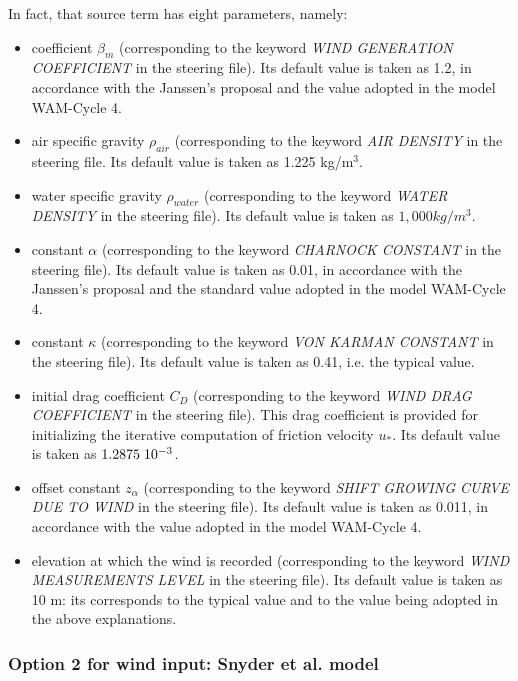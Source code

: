 In fact, that source term has eight parameters, namely:

\begin{itemize}
\item  coefficient $\beta_m$ (corresponding to the keyword \textit{WIND
  GENERATION COEFFICIENT }in the steering file). Its default value is taken
  as 1.2, in accordance with the Janssen's proposal \cite{Janssen1991} and
  the value adopted in the model WAM-Cycle 4.
\item  air specific gravity $\rho_{air}$ (corresponding to the keyword
  \textit{AIR DENSITY} in the steering file. Its default value is taken as
  1.225 kg/m${}^{3}$.
\item  water specific gravity ${\rho}_{water}$ (corresponding to the keyword
  \textit{WATER DENSITY} in the steering file). Its default value is taken as
  $1,000 kg/m^{3}$.
\item  constant $\alpha$ (corresponding to the keyword \textit{CHARNOCK
  CONSTANT} in the steering file). Its default value is taken as 0.01, in
  accordance with the Janssen's proposal and the standard value adopted in the
  model WAM-Cycle 4.
\item  constant $\kappa$ (corresponding to the keyword \textit{VON KARMAN
  CONSTANT} in the steering file). Its default value is taken as 0.41, i.e.
  the typical value.
\item  initial drag coefficient $C_D$ (corresponding to the keyword
  \textit{WIND DRAG COEFFICIENT} in the steering file). This drag coefficient
  is provided for initializing the iterative computation of friction velocity
  $u_*$. Its default value is taken as $1.2875\hspace{.1cm} 10^{-3}$.
\item  offset constant $z_\alpha$ (corresponding to the keyword \textit{SHIFT
  GROWING CURVE DUE TO WIND} in the steering file). Its default value is taken
  as 0.011, in accordance with the value adopted in the model WAM-Cycle 4.
\item  elevation at which the wind is recorded (corresponding to the keyword
  \textit{WIND MEASUREMENTS LEVEL} in the steering file). Its default value
  is taken as 10 m: its corresponds to the typical value and to the value
  being adopted in the above explanations.
\end{itemize}


\subsubsection{Option 2 for wind input: Snyder et al. model}
\label{parag4.3.2.2}

